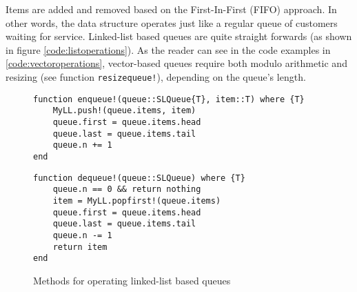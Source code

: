 \documentclass[a4paper, 11pt]{article}
\begin{document}
Items are added and removed based on the First-In-First (FIFO) approach. 
In other words, the data structure operates just like a regular queue of
customers waiting for service. 
Linked-list based queues are quite straight forwards 
(as shown in figure \autoref{code:listoperations}).
As the reader can see in the code examples in
\autoref{code:vectoroperations}, vector-based queues require both modulo
arithmetic and resizing (see function \texttt{resizequeue!}), 
depending on the queue's length.

    \begin{figure}[H]
        \centering
    \begin{verbatim}
function enqueue!(queue::SLQueue{T}, item::T) where {T}
    MyLL.push!(queue.items, item)
    queue.first = queue.items.head
    queue.last = queue.items.tail
    queue.n += 1
end
    \end{verbatim}
    \begin{verbatim}
function dequeue!(queue::SLQueue) where {T}
    queue.n == 0 && return nothing
    item = MyLL.popfirst!(queue.items)
    queue.first = queue.items.head
    queue.last = queue.items.tail
    queue.n -= 1
    return item
end
    \end{verbatim}
    \caption{Methods for operating linked-list based queues}
    \label{code:listoperations}
    \end{figure}
\end{document}
